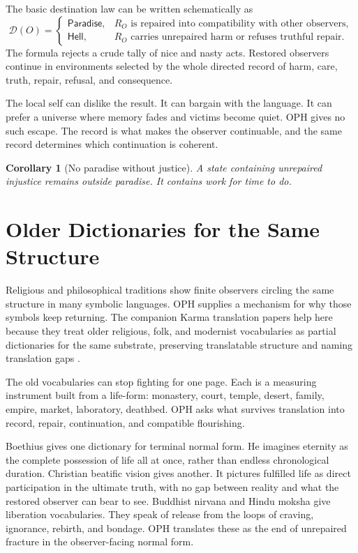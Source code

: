\documentclass[11pt]{article}
\newtheorem{corollary}[definition]{Corollary}
\theoremstyle{remark}
\theoremstyle{plain}
\newcommand{\Dest}{\mathcal D}
\begin{document}
The basic destination law can be written schematically as
\[
\Dest(O)=
\begin{cases}
\mathsf{Paradise}, & R_O \text{ is repaired into compatibility with other observers},\\
\mathsf{Hell}, & R_O \text{ carries unrepaired harm or refuses truthful repair}.
\end{cases}
\]
The formula rejects a crude tally of nice and nasty acts. Restored observers
continue in environments selected by the whole directed record of harm, care,
truth, repair, refusal, and consequence.

The local self can dislike the result. It can bargain with the language. It can
prefer a universe where memory fades and victims become quiet. OPH gives no
such escape. The record is what makes the observer continuable, and the same
record determines which continuation is coherent.

\begin{corollary}[No paradise without justice]
A state containing unrepaired injustice remains outside paradise. It contains
work for time to do.
\end{corollary}

\section{Older Dictionaries for the Same Structure}

Religious and philosophical traditions show finite observers circling the same
structure in many symbolic languages. OPH supplies a mechanism for why those
symbols keep returning.
The companion Karma translation papers help here because they treat older
religious, folk, and modernist vocabularies as partial dictionaries for the
same substrate, preserving translatable structure and naming translation gaps
\cite{KarmaRight,KarmaWrong}.

The old vocabularies can stop fighting for one page. Each is a measuring
instrument built from a life-form: monastery, court, temple, desert, family,
empire, market, laboratory, deathbed. OPH asks what survives translation into
record, repair, continuation, and compatible flourishing.

Boethius gives one dictionary for terminal normal form. He imagines eternity as
the complete possession of life all at once, rather than endless chronological
duration. Christian beatific vision gives another. It pictures fulfilled life as
direct participation in the ultimate truth, with no gap between reality and what
the restored observer can bear to see. Buddhist nirvana and Hindu moksha give
liberation vocabularies. They speak of release from the loops of craving,
ignorance, rebirth, and bondage. OPH translates these as the end of unrepaired
fracture in the observer-facing normal form.
\end{document}
